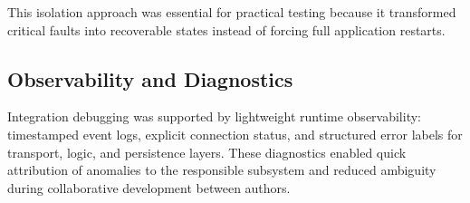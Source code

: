 This isolation approach was essential for practical testing because it transformed critical faults into recoverable states instead of forcing full application restarts.

\subsection{Observability and Diagnostics}
Integration debugging was supported by lightweight runtime observability: timestamped event logs, explicit connection status, and structured error labels for transport, logic, and persistence layers. These diagnostics enabled quick attribution of anomalies to the responsible subsystem and reduced ambiguity during collaborative development between authors.

\setauthor{\secondauthor}